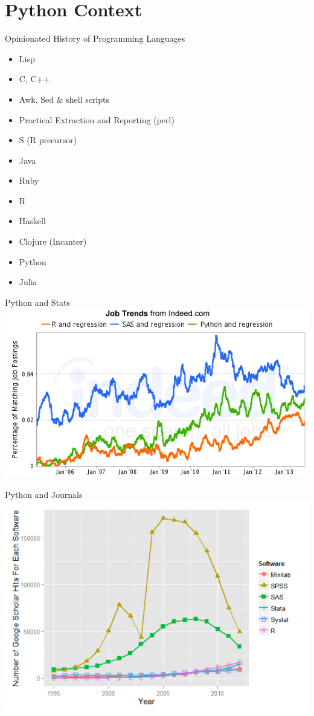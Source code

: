 \documentclass[presentation]{beamer}
\begin{document}
\section{Python Context}
\label{sec-2}

\begin{frame}[label=sec-2-0-1]{Opinionated  History of Programming Languages}
\begin{itemize}
\item Lisp
\item C, C++
\item Awk, Sed \& shell scripts
\item Practical Extraction and Reporting (perl)
\item S (R precursor)
\item Java
\item Ruby
\item R
\item Haskell
\item Clojure (Incanter)
\item Python
\item Julia
\end{itemize}
\end{frame}

\begin{frame}[label=sec-2-0-2]{Python and Stats}
\includegraphics[width=.9\linewidth]{./images/lang_and_regression.png}
\end{frame}

\begin{frame}[label=sec-2-0-3]{Python and Journals}
\includegraphics[width=.9\linewidth]{./images/lang_in_journals.png}
\end{frame}
\end{document}
